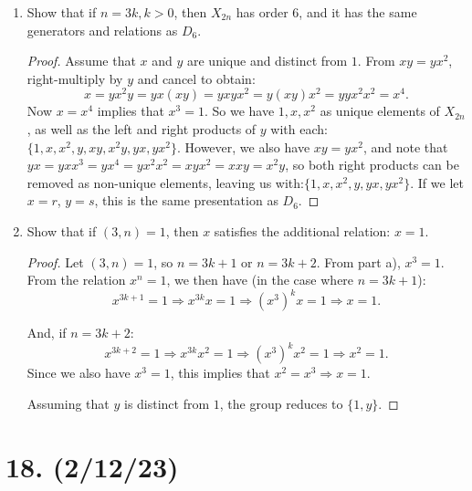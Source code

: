 \documentclass{article}
\begin{document}
\begin{enumerate}[label=(\alph*)]
    \item Show that if $n = 3k, k > 0$, then $X_{2n}$ has order 6, and it has the same generators and relations as $D_6$.
          \begin{proof}
            Assume that $x$ and $y$ are unique and distinct from $1$. From $xy = yx^2$, right-multiply by $y$ and cancel to obtain:
            \begin{equation*}
                x = yx^2y = yx(xy) = yxyx^2 = y(xy)x^2 = yyx^2x^2 = x^4.
            \end{equation*}
            Now $x = x^4$ implies that $x^3 = 1$. So we have $1, x, x^2$ as unique elements of $X_{2n}$, as well as the left and right products of $y$ with each: $\{1, x, x^2, y, xy, x^2y, yx, yx^2\}$. However, we also have $xy = yx^2$, and note that $yx = yx x^3 = yx^4 = yx^2 x^2 = xy x^2 = xxy = x^2 y$, so both right products can be removed as non-unique elements, leaving us with:\newline $\{1, x, x^2, y, yx, yx^2\}$. If we let $x = r$, $y = s$, this is the same presentation as $D_6$.
          \end{proof}
    \item Show that if $(3, n) = 1$, then $x$ satisfies the additional relation: $x = 1$.
          \begin{proof}
            Let $(3, n) = 1$, so $n = 3k + 1$ or $n = 3k + 2$. From part a), $x^3 = 1$. From the relation $x^n = 1$, we then have (in the case where $n = 3k + 1$):
            \begin{equation*}
                x^{3k + 1} = 1 \Rightarrow x^{3k} x = 1 \Rightarrow (x^3)^k x = 1 \Rightarrow x = 1.
            \end{equation*}

            And, if $n = 3k + 2$:
            \begin{equation*}
                x^{3k + 2} = 1 \Rightarrow x^{3k} x^2 = 1 \Rightarrow (x^3)^k x^2 = 1 \Rightarrow x^2 = 1.
            \end{equation*}
            Since we also have $x^3 = 1$, this implies that $x^2 = x^3 \Rightarrow x = 1$.

            Assuming that $y$ is distinct from $1$, the group reduces to $\{1, y\}$.
          \end{proof}
\end{enumerate}

\section*{18. (2/12/23)}
\end{document}

